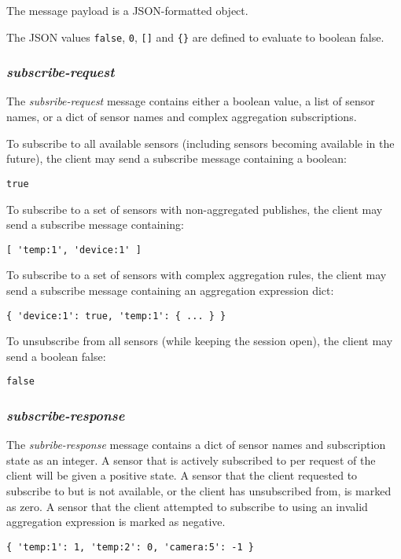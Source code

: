 \documentclass[a4paper]{article}
\begin{document}
The message payload is a JSON-formatted object.

The JSON values \texttt{false}, \texttt{0}, \texttt{[]} and \texttt{\{\}} are defined to evaluate to boolean false.

\subsubsection{\emph{subscribe-request}}
The \emph{subsribe-request} message contains either a boolean value, a list of sensor names, or a dict of sensor names and complex aggregation subscriptions.

To subscribe to all available sensors (including sensors becoming available in the future), the client may send a subscribe message containing a boolean:
\begin{verbatim}
true
\end{verbatim}

To subscribe to a set of sensors with non-aggregated publishes, the client may send a subscribe message containing:
\begin{verbatim}
[ 'temp:1', 'device:1' ]
\end{verbatim}

To subscribe to a set of sensors with complex aggregation rules, the client may send a subscribe message containing an aggregation expression dict:
\begin{verbatim}
{ 'device:1': true, 'temp:1': { ... } }
\end{verbatim}

To unsubscribe from all sensors (while keeping the session open), the client may send a boolean false:
\begin{verbatim}
false
\end{verbatim}

\subsubsection{\emph{subscribe-response}}
The \emph{subribe-response} message contains a dict of sensor names and subscription state as an integer. A sensor that is actively subscribed to per request of the client will be given a positive state. A sensor that the client requested to subscribe to but is not available, or the client has unsubscribed from, is marked as zero. A sensor that the client attempted to subscribe to using an invalid aggregation expression is marked as negative.

\begin{verbatim}
{ 'temp:1': 1, 'temp:2': 0, 'camera:5': -1 }
\end{verbatim}
\end{document}
